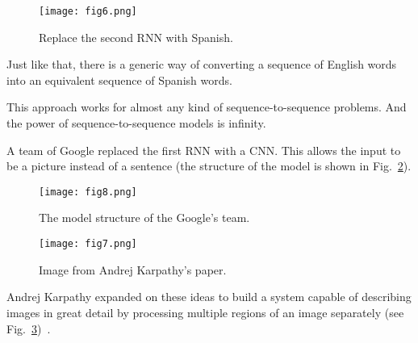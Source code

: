 \documentclass[10pt,twocolumn,letterpaper]{article}
\begin{document}
	\begin{figure}[h]
		\centering
		\texttt{[image: fig6.png]}
		\caption{Replace the second RNN with Spanish.}\label{fig6}
	\end{figure}
	\par
	Just like that, there is a generic way of converting a sequence of English words into an equivalent sequence of Spanish words.
	\par
	This approach works for almost any kind of sequence-to-sequence problems. And the power of sequence-to-sequence models is infinity.
	\par
	A team of Google replaced the first RNN with a CNN. This allows the input to be a picture instead of a sentence (the structure of the model is shown in Fig.~\ref{fig8}).
	\begin{figure}[h]
		\centering
		\texttt{[image: fig8.png]}
		\caption{The model structure of the Google's team.}\label{fig8}
	\end{figure}
	\begin{figure}[h]
	\centering
	\texttt{[image: fig7.png]}
	\caption{Image from Andrej Karpathy's paper.}\label{fig7}
	\end{figure}
	\par
	Andrej Karpathy expanded on these ideas to build a system capable of describing images in great detail by processing multiple regions of an image separately (see Fig.~\ref{fig7})~\cite{Karpathy}.

	


	



		



	{\small
		
		
	}
\end{document}
